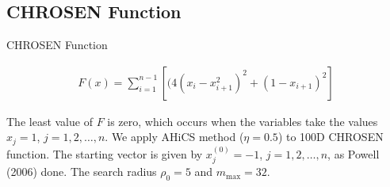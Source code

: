 \documentclass{beamer}
\begin{document}
\subsection{CHROSEN Function}
\begin{frame}{CHROSEN Function}

\footnotesize{
\begin{align*}
	F(x) = \sum_{i=1}^{n-1}[(4(x_i-x_{i+1}^2)^2 + (1-x_{i+1})^2]
\end{align*}

The least value of $F$ is zero, which occurs when the variables take the values
$x_j=1$, $j=1,2,\dots,n$.
We apply AHiCS method ($\eta=0.5$) to 100D CHROSEN function.
The starting vector is given by $x_j^{(0)}=-1$, $j=1,2,\dots,n$, as
Powell (2006) done. The search radius $\rho_0=5$ and $m_{\max}=32$.
}
%
\begin{figure}[!htbp]
	\centering

\end{figure}
\end{frame}
\end{document}
